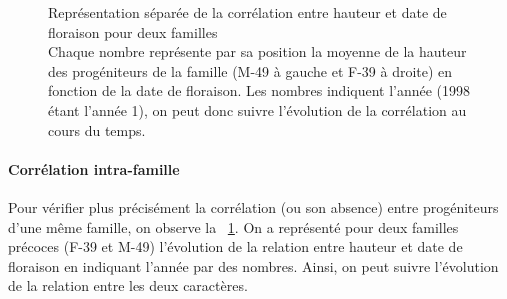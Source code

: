 \documentclass[12pt,a4paper]{article}
\begin{document}
	 						\begin{figure} %
			 					\centering
			 					\caption{Représentation séparée de la corrélation entre hauteur et date de floraison pour deux familles\\
			 					Chaque nombre représente par sa position la moyenne de la hauteur des progéniteurs de la famille (M-49 à gauche et F-39 à droite) en fonction de la date de floraison. Les nombres indiquent l'année (1998 étant l'année 1), on peut donc suivre l'évolution de la corrélation au cours du temps.
			 					\label{correl.fam}}
			 				\end{figure}			 				
			 				
			 				\paragraph{Corrélation intra-famille}
			 					
								Pour vérifier plus précisément la corrélation (ou son absence) entre progéniteurs d'une même famille, on observe la ~\ref{correl.fam}. On a représenté pour deux familles précoces (F-39 et M-49) l'évolution de la relation entre hauteur et date de floraison en indiquant l'année par des nombres. Ainsi, on peut suivre l'évolution de la relation entre les deux caractères. \\
								
\end{document}

